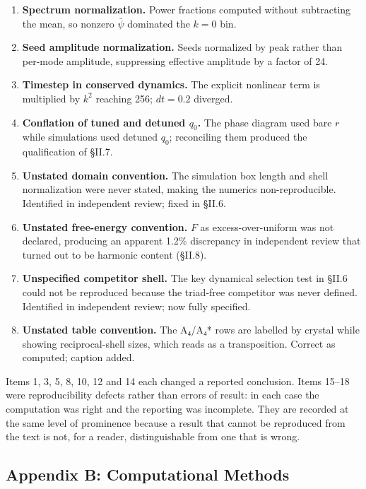 \documentclass[a4paper,11pt]{article}
\begin{document}
\begin{enumerate}
\item \textbf{Spectrum normalization.} Power fractions computed without subtracting the mean, so nonzero $\bar\psi$ dominated the $k=0$ bin.
\item \textbf{Seed amplitude normalization.} Seeds normalized by peak rather than per-mode amplitude, suppressing effective amplitude by a factor of 24.
\item \textbf{Timestep in conserved dynamics.} The explicit nonlinear term is multiplied by $k^2$ reaching 256; $dt=0.2$ diverged.
\item \textbf{Conflation of tuned and detuned $q_0$.} The phase diagram used bare $r$ while simulations used detuned $q_0$; reconciling them produced the qualification of §II.7.
\item \textbf{Unstated domain convention.} The simulation box length and shell normalization were never stated, making the numerics non-reproducible. Identified in independent review; fixed in §II.6.
\item \textbf{Unstated free-energy convention.} $F$ as excess-over-uniform was not declared, producing an apparent 1.2\% discrepancy in independent review that turned out to be harmonic content (§II.8).
\item \textbf{Unspecified competitor shell.} The key dynamical selection test in §II.6 could not be reproduced because the triad-free competitor was never defined. Identified in independent review; now fully specified.
\item \textbf{Unstated table convention.} The A₄/A₄* rows are labelled by crystal while showing reciprocal-shell sizes, which reads as a transposition. Correct as computed; caption added.
\end{enumerate}

Items 1, 3, 5, 8, 10, 12 and 14 each changed a reported conclusion. Items 15–18 were reproducibility defects rather than errors of result: in each case the computation was right and the reporting was incomplete. They are recorded at the same level of prominence because a result that cannot be reproduced from the text is not, for a reader, distinguishable from one that is wrong.

\subsection*{Appendix B: Computational Methods}
\end{document}
